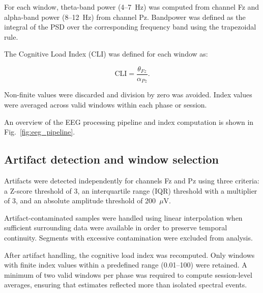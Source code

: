 \documentclass[10pt]{iopart}
\begin{document}
For each window, theta-band power (4--7~Hz) was computed from channel Fz and alpha-band power (8--12~Hz) from channel Pz. Bandpower was defined as the integral of the PSD over the corresponding frequency band using the trapezoidal rule.

The Cognitive Load Index (CLI) was defined for each window as:

\begin{equation}
\mathrm{CLI} = \frac{\theta_{Fz}}{\alpha_{Pz}}.
\label{eq:cli}
\end{equation}

Non-finite values were discarded and division by zero was avoided. Index values were averaged across valid windows within each phase or session.

An overview of the EEG processing pipeline and index computation is shown in Fig.~\ref{fig:eeg_pipeline}.

\subsection{Artifact detection and window selection}

Artifacts were detected independently for channels Fz and Pz using three criteria: a Z-score threshold of 3, an interquartile range (IQR) threshold with a multiplier of 3, and an absolute amplitude threshold of 200~$\mu$V.

Artifact-contaminated samples were handled using linear interpolation when sufficient surrounding data were available in order to preserve temporal continuity. Segments with excessive contamination were excluded from analysis.

After artifact handling, the cognitive load index was recomputed. Only windows with finite index values within a predefined range (0.01--100) were retained. A minimum of two valid windows per phase was required to compute session-level averages, ensuring that estimates reflected more than isolated spectral events.
\end{document}
